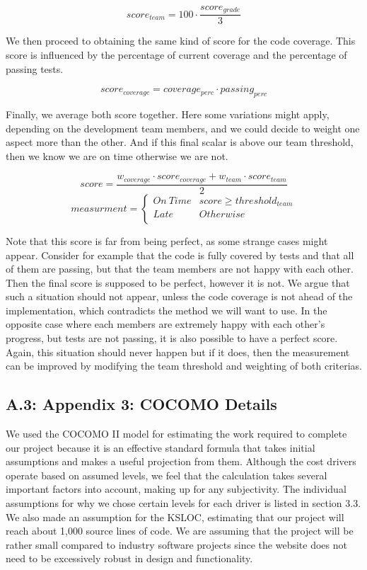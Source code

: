 \documentclass[]{article}
\begin{document}
$$
score_{team} = 100 \cdot \frac{score_{grade}}{3}
$$

We then proceed to obtaining the same kind of score for the code coverage. This score is influenced by the percentage of current coverage and the percentage of passing tests.

$$
score_{coverage} = coverage_{perc} \cdot passing_{perc}
$$

Finally, we average both score together. Here some variations might apply, depending on the development team members, and we could decide to weight one aspect more than the other. And if this final scalar is above our team threshold, then we know we are on time otherwise we are not.

$$
score = \frac{w_{coverage} \cdot score_{coverage} + w_{team} \cdot score_{team}}{2}
$$
$$
measurment =
\begin{cases}
On\ Time &  score \geq threshold_{team} \\
Late & Otherwise \\
\end{cases}
$$

Note that this score is far from being perfect, as some strange cases might appear. Consider for example that the code is fully covered by tests and that all of them are passing, but that the team members are not happy with each other. Then the final score is supposed to be perfect, however it is not. We argue that such a situation should not appear, unless the code coverage is not ahead of the implementation, which contradicts the method we will want to use. In the opposite case where each members are extremely happy with each other's progress, but tests are not passing, it is also possible to have a perfect score. Again, this situation should never happen but if it does, then the measurement can be improved by modifying the team threshold and weighting of both criterias.


\subsection{A.3: Appendix 3: COCOMO
Details}\label{a.3-appendix-3-cocomo-details}

We used the COCOMO II model for estimating the work required to complete
our project because it is an effective standard formula that takes
initial assumptions and makes a useful projection from them. Although
the cost drivers operate based on assumed levels, we feel that the
calculation takes several important factors into account, making up for
any subjectivity. The individual assumptions for why we chose certain
levels for each driver is listed in section 3.3. We also made an
assumption for the KSLOC, estimating that our project will reach about
1,000 source lines of code. We are assuming that the project will be
rather small compared to industry software projects since the website
does not need to be excessively robust in design and functionality.
\end{document}

